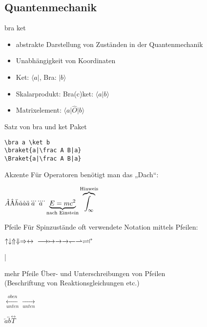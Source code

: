 \documentclass[
	vorläufig=false,
	datum=2016-11-18,
	titel={Mathematiksatz II},
	web=false,
]{../tex/latexkurs-slides}
\begin{document}
\subsection{Quantenmechanik}
\begin{frame}[fragile]{bra ket}
\begin{itemize}
\item abstrakte Darstellung von Zuständen in der Quantenmechanik
\item Unabhängigkeit von Koordinaten
\item Ket: $\langle a\rvert$, Bra: $\lvert b \rangle$
\item Skalarprodukt: Bra(c)ket: $\langle a \vert b\rangle$
\item Matrixelement: $\langle a\vert \hat O \vert b \rangle$
\end{itemize}
\end{frame}

\begin{frame}[fragile]{Satz von bra und ket}
Paket 
\begin{lstlisting}
\bra a \ket b
\braket{a|\frac A B|a}
\Braket{a|\frac A B|a}
\end{lstlisting}
\end{frame}

\begin{frame}[fragile]{Akzente}
Für Operatoren benötigt man das „Dach“:
\begin{LTXexample}[width=.4\textwidth]
$\hat A \hat{\mathrm{A}} \bar h \check a \dot a\\
\ddot a \dddot a \ddddot a\\
\underbrace{E = mc^2}_\text{nach Einstein}\overbrace{\int_\infty}^{\text{Hinweis}}$
\end{LTXexample}
\end{frame}

\begin{frame}[fragile]{Pfeile}
Für Spinzustände oft verwendete Notation mittels Pfeilen:
\begin{LTXexample}[width=.4\textwidth]
$\uparrow \downarrow \Uparrow \Downarrow
\Rightarrow \leftrightarrow\\
\longrightarrow \mapsto \to \rightarrow
\leftharpoondown \rightharpoonup \rightleftharpoons
\Rsh$
\end{LTXexample}
\end{frame}

\MakeShortVerb|
\begin{frame}[fragile]{mehr Pfeile}
Über- und Unterschreibungen von Pfeilen\\ (Beschriftung von Reaktionsgleichungen etc.)
\begin{LTXexample}
$\xleftarrow[unten]{oben}
 \xrightarrow[unten]{}$
\end{LTXexample}
\begin{LTXexample}
$\overleftarrow a
\overleftrightarrow b
\stackrel\leftrightarrow T$
\end{LTXexample}
\end{frame}
\end{document}
